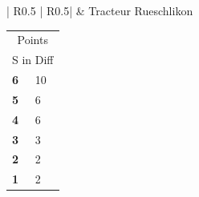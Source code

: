 \documentclass[a4paper,10pt]{scrartcl}
\begin{document}
\begin{minipage}{0.95\linewidth}
  \begin{tabular}{| R{0.5\linewidth} |  R{0.5\linewidth}|}
    \bottomrule{} & Tracteur Rueschlikon \\
    \toprule
  \end{tabular}
  \begin{minipage}{0.09\linewidth}
    \begin{tabular}{l l}
      \multicolumn{2}{c}{
        Points }                    \\
      \multicolumn{2}{c}{S in Diff} \\
      \midrule

      \textbf{ 6 } & 10 \\

      \textbf{ 5 } & 6 \\

      \textbf{ 4 } & 6 \\

      \textbf{ 3 } & 3 \\

      \textbf{ 2 } & 2 \\

      \textbf{ 1 } & 2 \\


\end{tabular}
\end{minipage}
\end{minipage}
\end{document}
